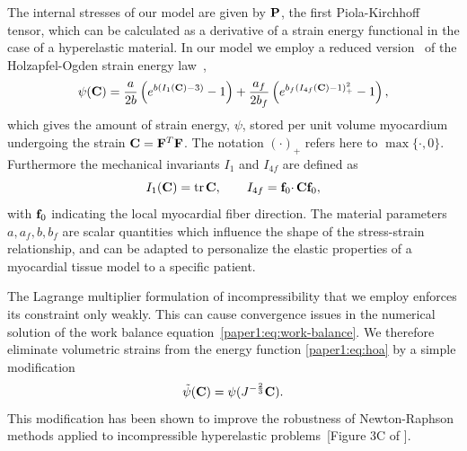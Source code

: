 The internal stresses of our model are given by $\mathbf{P}$, the first Piola-Kirchhoff tensor,
which can be calculated as a derivative of a strain energy functional
in the case of a hyperelastic material.
In our model we employ a reduced version~\cite{Krishnamurthy2013, gjerald2015patient,
  asner2015estimation, hadjicharalambous2015analysis} of the
Holzapfel-Ogden strain energy law~\cite{Holzapfel2009}, 
\begin{equation}
\label{paper1:eq:hoa}
 \psi(\mathbf{C}) = \frac{a}{2 b} \left( e^{ b (I_1(\mathbf{C})
 - 3)}  -1 \right)
 + \frac{a_f}{2b_f} \left( e^{ b_f (I_{4f}(\mathbf{C})
 - 1)_+^2} -1 \right),
\end{equation}
which gives the amount of strain energy, $\psi$, stored per unit
volume myocardium undergoing the strain $\mathbf{C} = \mathbf{F}^{T} \mathbf{F}$.
The notation
$(\cdotp)_{+}$ refers here to $\max\{\cdotp, 0\}$.  Furthermore
the mechanical invariants $I_1$ and $I_{4f}$ are defined as
\begin{equation}
I_1(\mathbf{C}) = \mathrm{tr} \hspace{0.05cm} \mathbf{C},  \quad \quad I_{4f} = \mathbf{f}_0 \cdotp \mathbf{C} \mathbf{f}_0,
\end{equation}
with $\mathbf{f}_0$ indicating the local myocardial fiber direction. The
material parameters $a, a_f, b, b_f$ are scalar quantities which influence the shape of
the stress-strain relationship, and can be adapted to personalize the
elastic properties of a myocardial tissue model to a specific patient.

The Lagrange multiplier formulation of incompressibility that we 
 employ enforces its constraint only weakly. This can cause
 convergence issues in the numerical solution of the work balance equation~\eqref{paper1:eq:work-balance}. We therefore
 eliminate volumetric strains from the energy function \eqref{paper1:eq:hoa}
 by a simple modification
 \begin{equation}
  \tilde{\psi}(\mathbf{C}) = \psi(J^{-\frac{2}{3}}\mathbf{C}).
 \label{paper1:eq:strain_energy}
 \end{equation}
 This modification has been shown to improve the robustness of
 Newton-Raphson methods applied to incompressible hyperelastic
 problems~[Figure 3C of \cite{land2015improving}].

